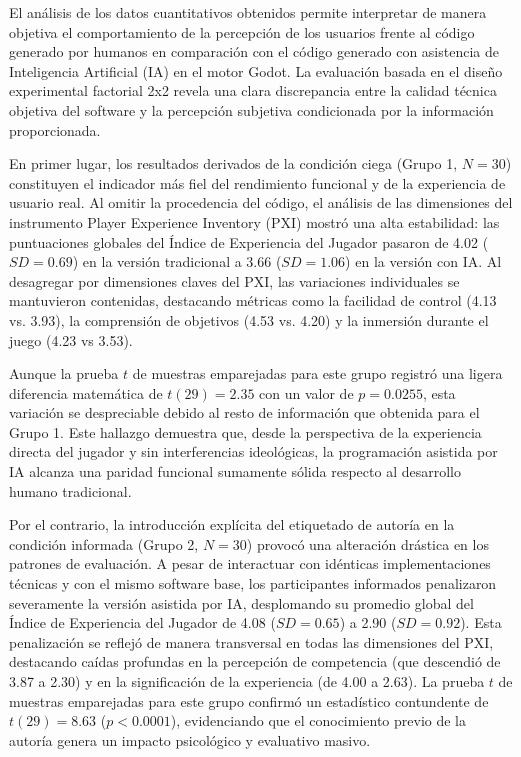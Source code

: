 El análisis de los datos cuantitativos obtenidos permite interpretar de manera objetiva el comportamiento de la percepción de los usuarios frente al código generado por humanos en comparación con el código generado con asistencia de Inteligencia Artificial (IA) en el motor Godot. La evaluación basada en el diseño experimental factorial 2x2 revela una clara discrepancia entre la calidad técnica objetiva del software y la percepción subjetiva condicionada por la información proporcionada.

En primer lugar, los resultados derivados de la condición ciega (Grupo 1, $N = 30$) constituyen el indicador más fiel del rendimiento funcional y de la experiencia de usuario real. Al omitir la procedencia del código, el análisis de las dimensiones del instrumento Player Experience Inventory (PXI) mostró una alta estabilidad: las puntuaciones globales del Índice de Experiencia del Jugador pasaron de 4.02 ($SD = 0.69$) en la versión tradicional a 3.66 ($SD = 1.06$) en la versión con IA. Al desagregar por dimensiones claves del PXI, las variaciones individuales se mantuvieron contenidas, destacando métricas como la facilidad de control (4.13 vs. 3.93), la comprensión de objetivos (4.53 vs. 4.20) y la inmersión durante el juego (4.23 vs 3.53).

Aunque la prueba $t$ de muestras emparejadas para este grupo registró una ligera diferencia matemática de $t(29) = 2.35$ con un valor de $p = 0.0255$, esta variación se despreciable debido al resto de información que obtenida para el Grupo 1. Este hallazgo demuestra que, desde la perspectiva de la experiencia directa del jugador y sin interferencias ideológicas, la programación asistida por IA alcanza una paridad funcional sumamente sólida respecto al desarrollo humano tradicional.

Por el contrario, la introducción explícita del etiquetado de autoría en la condición informada (Grupo 2, $N = 30$) provocó una alteración drástica en los patrones de evaluación. A pesar de interactuar con idénticas implementaciones técnicas y con el mismo software base, los participantes informados penalizaron severamente la versión asistida por IA, desplomando su promedio global del Índice de Experiencia del Jugador de 4.08 ($SD = 0.65$) a 2.90 ($SD = 0.92$). Esta penalización se reflejó de manera transversal en todas las dimensiones del PXI, destacando caídas profundas en la percepción de competencia (que descendió de 3.87 a 2.30) y en la significación de la experiencia (de 4.00 a 2.63). La prueba $t$ de muestras emparejadas para este grupo confirmó un estadístico contundente de $t(29) = 8.63$ ($p < 0.0001$), evidenciando que el conocimiento previo de la autoría genera un impacto psicológico y evaluativo masivo.

